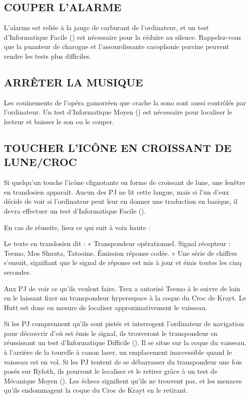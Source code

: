 \documentclass[a4paper,10pt,twoside,twocolumn,openany]{book}
\begin{document}
\subsection{COUPER L’ALARME}
L’alarme est reliée à la jauge de carburant de l’ordinateur, et un test d’Informatique Facile (\difficulty) est nécessaire
pour la réduire au silence. Rappelez-vous que la puanteur de charogne et l’assourdissante cacophonie porcine
peuvent rendre les tests plus difficiles.

\subsection{ARRÊTER LA MUSIQUE}
Les couinements de l’opéra gamorréen que crache la sono sont aussi contrôlés par l’ordinateur. Un test d’Informatique Moyen (\difficulty \difficulty) est nécessaire pour localiser
le lecteur et baisser le son ou le couper.

\subsection{TOUCHER L’ICÔNE EN CROISSANT DE LUNE/CROC}

Si quelqu’un touche l’icône clignotante en forme de croissant de lune, une fenêtre en trandosien apparaît. Aucun des PJ ne lit cette langue, mais si l’un d’eux décide de voir si l’ordinateur peut leur en donner une traduction en basique, il devra effectuer un test d’Informatique Facile (\difficulty).

En cas de réussite, lisez ce qui suit à voix haute :
\begin{quotebox}
Le texte en trandosien dit : « Transpondeur opérationnel. Signal récepteur : Teemo, Mos Shuuta,
Tatooine. Émission réponse codée. » Une série de
chiffres s’ensuit, signifiant que le signal de réponse
est mis à jour et émis toutes les cinq secondes.
\end{quotebox}

Aux PJ de voir ce qu’ils veulent faire. Trex a autorisé Teemo à le suivre de loin en le laissant fixer un transpondeur hyperespace à la coque du Croc de Krayt. Le Hutt est donc en mesure de localiser approximativement le vaisseau.

Si les PJ comprennent qu’ils sont pistés et interrogent l’ordinateur de navigation pour découvrir d’où est émis le signal, ils trouveront le transpondeur en réussissant un test d’Informatique Difficile (\difficulty \difficulty \difficulty). Il se situe sur la coque du vaisseau, à l’arrière de la tourelle à canon laser,
un emplacement inaccessible quand le vaisseau est en vol. Si les PJ tentent de se débarrasser du transpondeur une fois posés sur Ryloth, ils pourront le localiser et le retirer grâce à un test de Mécanique Moyen (\difficulty \difficulty). 
Les échecs \failure signifient qu’ils ne trouvent pas, et les menaces \threat qu’ils endommagent la coque du Croc de Krayt en le retirant.
\end{document}
